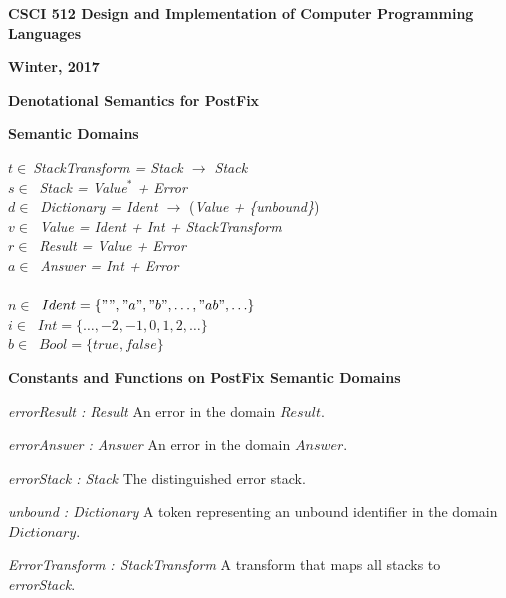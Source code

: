 \documentclass[12pt]{report}
\begin{document}
\begin{center}
\begin{Large} {\bf CSCI 512 Design and Implementation of Computer Programming Languages } \end{Large}

\begin{Large} {\bf Winter, 2017 } \end{Large}
\end{center}

\begin{large}
{\bf Denotational Semantics for PostFix}
\end{large}

{\bf Semantic Domains}
\begin{tabbing}
$t\in\:$\= {\em StackTransform = Stack $\rightarrow$ Stack}\\
$s\in\:$\> {\em Stack = Value$^*$ + Error}\\
$d\in\:$\> {\em Dictionary = Ident $\rightarrow$} ({\em Value + \{{unbound}\}})\\
$v\in\:$\> {\em Value = Ident + Int + StackTransform} \\
$r\in\:$\> {\em Result = Value + Error}\\
$a\in\:$\> {\em Answer = Int + Error}\\
\\
$n\in\:$\> $Ident = \{"","a","b",\ldots,"ab",\ldots\}$ \\
$i\in\:$\> $Int = \{\ldots,-2,-1,0,1,2,\ldots\}$ \\
$b\in\:$\> $Bool=\{true,false\}$
\end{tabbing}

{\bf Constants and Functions on PostFix Semantic Domains}

\hangindent=10mm {\em errorResult : Result} \newline
An error in the domain $Result$. 

\hangindent=10mm {\em errorAnswer : Answer} \newline
An error in the domain $Answer$. 

\hangindent=10mm {\em errorStack : Stack} \newline
The distinguished error stack.

\hangindent=10mm {\em unbound : Dictionary} \newline
A token representing an unbound identifier in the domain $Dictionary$.  

\hangindent=10mm {\em ErrorTransform : StackTransform}\newline
A transform that maps all stacks to {\em errorStack}.
\end{document}
